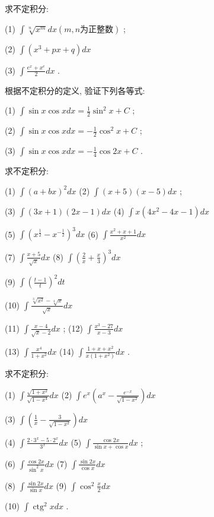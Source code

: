 \documentclass[lang=cn,newtx,10pt,scheme=chinese]{elegantbook}
\begin{document}
\begin{problemset}[习 题 十 三]

\item 求不定积分:

(1) \(\int \sqrt[n]{{x}^{m}}{dx}\left( {m,n\text{为正整数}}\right)\) ;

(2) \(\int \left( {{x}^{3} + {px} + q}\right) {dx}\)

(3) \(\int \frac{{e}^{x} + {x}^{e}}{2}{dx}\) .

\item 根据不定积分的定义, 验证下列各等式:

(1) \(\int \sin x\cos {xdx} = \frac{1}{2}{\sin }^{2}x + C\) ;

(2) \(\int \sin x\cos {xdx} = - \frac{1}{2}{\cos }^{2}x + C\) ;

(3) \(\int \sin x\cos {xdx} = - \frac{1}{4}\cos {2x} + C\) .

\item 求不定积分:

(1) \(\int {\left( a + bx\right) }^{2}{dx}\) (2) \(\int \left( {x + 5}\right) \left( {x - 5}\right) {dx}\) ;

(3) \(\int \left( {{3x} + 1}\right) \left( {{2x} - 1}\right) {dx}\) (4) \(\int x\left( {4{x}^{2} - {4x} - 1}\right) {dx}\)

(5) \(\int {\left( {x}^{\frac{1}{2}} - {x}^{-\frac{1}{2}}\right) }^{3}{dx}\) (6) \(\int \frac{{x}^{2} + x + 1}{{x}^{2}}{dx}\)

(7) \(\int \frac{x + 5}{\sqrt{x}}{dx}\) (8) \(\int {\left( \frac{2}{x} + \frac{x}{3}\right) }^{3}{dx}\)

(9) \(\int {\left( \frac{t - 1}{t}\right) }^{2}{dt}\)

(10) \( \int \frac{\sqrt[3]{x^{2}}-\sqrt[4]{x}}{\sqrt{x}} {d x}\)

(11) \(\int \frac{x - 4}{\sqrt{x} - 2}{dx}\) ; (12) \(\int \frac{{x}^{3} - {27}}{x - 3}{dx}\)

(13) \(\int \frac{{x}^{4}}{1 + {x}^{2}}{dx}\) (14) \(\int \frac{1 + x + {x}^{2}}{x\left( {1 + {x}^{2}}\right) }{dx}\) .

\item 求不定积分:

(1) \(\int \frac{\sqrt{1 + {x}^{2}}}{\sqrt{1 - {x}^{4}}}{dx}\) (2) \(\int {e}^{x}\left( {{a}^{x} - \frac{{e}^{-x}}{\sqrt{1 - {x}^{2}}}}\right) {dx}\)

(3) \(\int \left( {\frac{1}{x} - \frac{3}{\sqrt{1 - {x}^{2}}}}\right) {dx}\)

(4) \(\int \frac{2 \cdot {3}^{x} - 5 \cdot {2}^{x}}{{3}^{x}}{dx}\) (5) \(\int \frac{\cos {2x}}{\sin x + \cos x}{dx}\) ;

(6) \(\int \frac{\cos {2x}}{{\sin }^{2}x}{dx}\) (7) \(\int \frac{\sin {2x}}{\cos x}{dx}\)

(8) \(\int \frac{\sin {2x}}{\sin x}{dx}\) (9) \(\int {\cos }^{2}\frac{x}{2}{dx}\)

(10) \(\int {\operatorname{ctg}}^{2}{xdx}\) .

\end{problemset}
\end{document}
